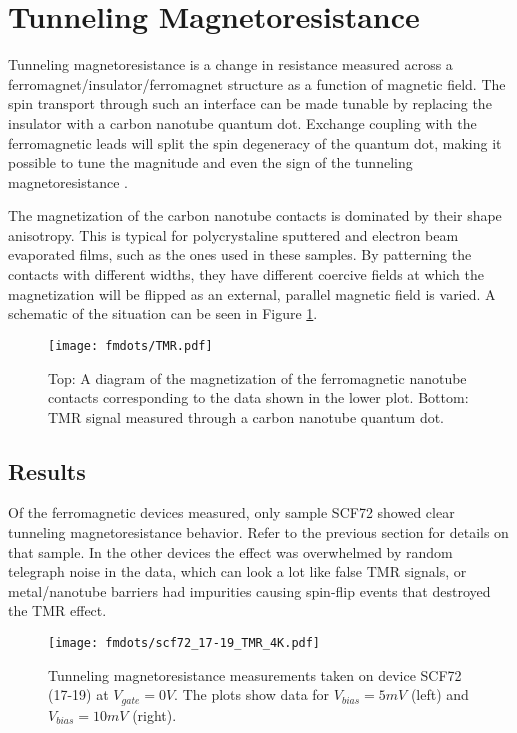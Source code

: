 \section{Tunneling Magnetoresistance}
\label{sec:TMR}

Tunneling magnetoresistance is a change in resistance measured across a ferromagnet/insulator/ferromagnet structure as a function of magnetic field. The spin transport through such an interface can be made tunable by replacing the insulator with a carbon nanotube quantum dot. Exchange coupling with the ferromagnetic leads will split the spin degeneracy of the quantum dot, making it possible to tune the magnitude and even the sign of the tunneling magnetoresistance \cite{Tsymbal2003, Sahoo2005, Thamankar2006}.

The magnetization of the carbon nanotube contacts is dominated by their shape anisotropy. This is typical for polycrystaline sputtered and electron beam evaporated films, such as the ones used in these samples. By patterning the contacts with different widths, they have different coercive fields at which the magnetization will be flipped as an external, parallel magnetic field is varied. A schematic of the situation can be seen in Figure \ref{fig:spin_valve}.

\begin{figure}
    \centering
    \texttt{[image: fmdots/TMR.pdf]}
    \caption{Top: A diagram of the magnetization of the ferromagnetic nanotube contacts corresponding to the data shown in the lower plot. Bottom: TMR signal measured through a carbon nanotube quantum dot.}
    \label{fig:spin_valve}
\end{figure}

\subsection{Results}

Of the ferromagnetic devices measured, only sample SCF72 showed clear tunneling magnetoresistance behavior. Refer to the previous section for details on that sample. In the other devices the effect was overwhelmed by random telegraph noise in the data, which can look a lot like false TMR signals, or metal/nanotube barriers had impurities causing spin-flip events that destroyed the TMR effect.

\begin{figure}
    \centering
    \texttt{[image: fmdots/scf72\_17-19\_TMR\_4K.pdf]}
    \caption{Tunneling magnetoresistance measurements taken on device SCF72 (17-19) at $V_{gate} = 0V$. The plots show data for $V_{bias} = 5mV$ (left) and $V_{bias} = 10mV$ (right).}
    \label{fig:TMR_real}
\end{figure}

